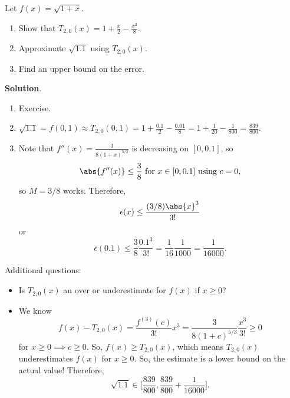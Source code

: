 \begin{Example}{}{}
    Let $ f(x)=\sqrt{1+x} $.
    \begin{enumerate}[(1)]
        \item Show that $  T_{2,0}(x)=1+\frac{x}{2}-\frac{x^2}{8} $.
        \item Approximate $ \sqrt{1.1} $ using $ T_{2,0}(x) $.
        \item Find an upper bound on the error.
    \end{enumerate}
    \tcblower{}
    \textbf{Solution}.
    \begin{enumerate}[(1)]
        \item Exercise.
        \item $ \sqrt{1.1}=f(0,1)\approx T_{2,0}(0,1)=1+\frac{0.1}{2}-\frac{0.01}{8}=1+\frac{1}{20}-\frac{1}{800}=\frac{839}{800} $.
        \item Note that $ f''(x)=\frac{3}{8(1+x)^{5/2}} $ is decreasing on $ [0,0.1] $, so
              \[ \abs{f''(x)}\le \frac{3}{8}\text{ for $x\in[0,0.1]$ using $c=0$}, \]
              so $ M=3/8 $ works. Therefore,
              \[ \epsilon(x)\le \frac{(3/8)\abs{x}^3}{3!} \]
              or
              \[ \epsilon(0.1)\le \frac{3}{8}\frac{0.1^3}{3!}=\frac{1}{16}\frac{1}{1000}=\frac{1}{16000}. \]
    \end{enumerate}
    Additional questions:
    \begin{itemize}
        \item Is $ T_{2,0}(x) $ an over or underestimate for $ f(x) $ if $ x\ge 0 $?
        \item We know
              \[ f(x)-T_{2,0}(x)=\frac{f^{(3)}(c)}{3!}x^3=\frac{3}{8(1+c)^{5/3}}\frac{x^3}{3!}\ge 0 \]
              for $ x\ge 0\implies c\ge 0 $. So, $ f(x)\ge T_{2,0}(x) $, which means $ T_{2,0}(x) $
              underestimates $ f(x) $ for $ x\ge 0 $. So, the estimate is a lower bound on the actual value! Therefore,
              \[ \sqrt{1.1}\in\biggl[\frac{839}{800},\frac{839}{800}+\frac{1}{16000}\biggr]. \]
    \end{itemize}
\end{Example}
